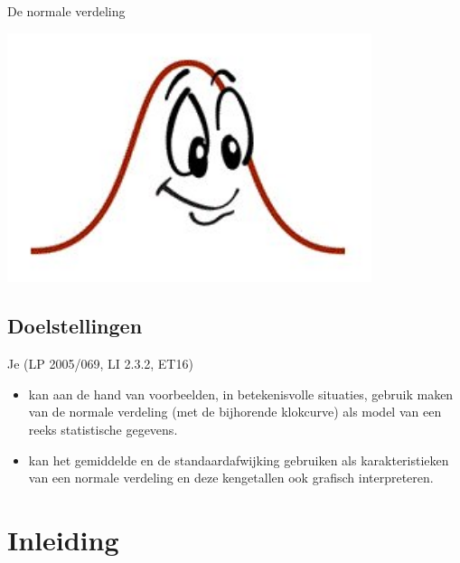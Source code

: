 \documentclass[12pt,twoside,a4paper]{article}
\begin{document}
\begin{center}
  \begin{mdframed}
  \centering
  \fontsize{50}{70}\selectfont De normale verdeling
  \end{mdframed}
  \vfill
  \includegraphics[width=0.8\textwidth]{normal}
  \vfill
\end{center}
\vspace*{-2cm}
\subsection*{Doelstellingen}
\begin{singlespacing}
Je \hfill  {\scriptsize(LP 2005/069, LI 2.3.2, ET16)}
\begin{itemize}
  \item kan aan de hand van voorbeelden, in betekenisvolle situaties, gebruik maken van de normale verdeling (met de bijhorende klokcurve) als model van een reeks statistische gegevens.
  \item kan het gemiddelde en de standaardafwijking gebruiken als karakteristieken van een normale verdeling en deze kengetallen ook grafisch interpreteren.
\end{itemize}
\end{singlespacing}

\thispagestyle{empty}
\clearpage

\tableofcontents
\thispagestyle{empty}
\clearpage


\pagestyle{fancy}
\fancyhead[RE,LO]{}

\cleardoublepage
\section{Inleiding}
\end{document}
